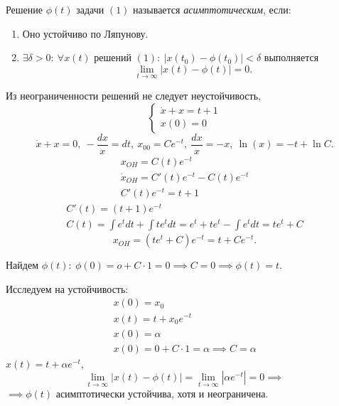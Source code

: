 \begin{definition}
	Решение $\phi (t)$ задачи $(1)$ называется \emph{асимптотическим}, если:
	\begin{enumerate}
		\item Оно устойчиво по Ляпунову.
		\item $\exists \delta >0: \ \forall x(t)$ решений $(1): \ \big|x(t_0) - \phi (t_0)\big| < \delta $ выполняется
		      \[
			      \underset{t \rightarrow \infty }{\lim} \big|x(t) - \phi (t)\big| = 0.
		      \]
	\end{enumerate}
\end{definition}

\begin{remark}
	Из неограниченности решений не следует неустойчивость,
	\[
		\left\{\begin{array}{l}
			\dot{x} + x = t+1 \\
			x(0) = 0
		\end{array}\right.
	\]
	\[
		\dot{x}+x = 0, \ -\frac{dx}{x} = dt, \ x_{00} = Ce^{-t} , \ \frac{dx}{x} = -x, \ \ln(x) = -t + \ln C.
	\]
	\[
		\begin{array}{l}
			x_{OH} = C(t)e^{-t}                     \\
			\dot{x}_{OH} = C '(t)e^{-t} -C(t)e^{-t} \\
			C ' (t) e^{-t} = t + 1
		\end{array}
	\]
	\[
		\begin{array}{l}
			C '(t) = (t+1)e^{-t} \\
			C(t) = \int e^t dt + \int te^t dt = e^t + t e^t - \int e^t dt = te^t + C
		\end{array}
	\]
	\[
		x_{OH} = (t e^t + C) e^{-t} = t + Ce^{-t} .
	\]

	Найдем $\phi (t): \ \phi (0) = o + C \cdot 1 = 0 \implies  C = 0 \implies  \phi (t) = t$.

	Исследуем на устойчивость:
	\[
		\begin{array}{l}
			x(0) = x_0            \\
			x(t) = t + x_0 e^{-t} \\
			x(0) = \alpha         \\
			x(0) = 0 + C \cdot 1 = \alpha  \implies  C = \alpha
		\end{array}
	\]
	$x(t) = t + \alpha e^{-t} $,
	\[
		\underset{t \rightarrow \infty }{\lim} \big|x(t) - \phi (t)\big| = \underset{t \rightarrow \infty }{\lim} |\alpha e^{-t} | = 0 \implies
	\]
	$\implies \phi (t)$ асимптотически устойчива, хотя и неограничена.
\end{remark}


